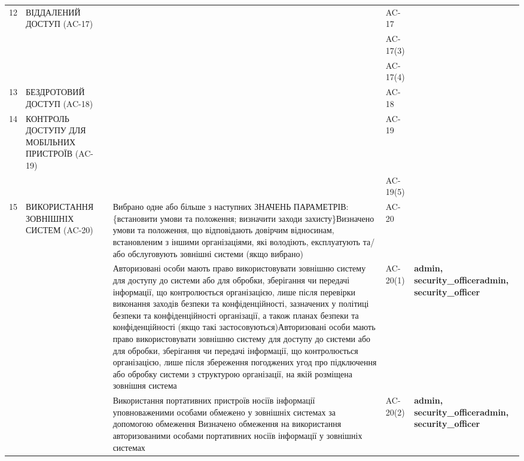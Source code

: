 \documentclass[10pt]{article}
\begin{document}
\begin{longtable}{|c|>{\raggedright\arraybackslash}p{4cm}|>{\raggedright\arraybackslash}p{6cm}|>{\raggedright\arraybackslash}p{2cm}|>{\raggedright\arraybackslash}p{4cm}|}
12 & ВІДДАЛЕНИЙ ДОСТУП (AC-17) &  & AC-17 &  \\ \cline{3-5}
 &  &  & AC-17(3) &  \\ \cline{3-5}
 &  &  & AC-17(4) &  \\ \hline
13 & БЕЗДРОТОВИЙ ДОСТУП (AC-18) &  & AC-18 &  \\ \hline
14 & КОНТРОЛЬ ДОСТУПУ ДЛЯ МОБІЛЬНИХ ПРИСТРОЇВ (AC-19) &  & AC-19 &  \\ \cline{3-5}
 &  &  & AC-19(5) &  \\ \hline
15 & ВИКОРИСТАННЯ ЗОВНІШНІХ СИСТЕМ (AC-20) & Вибрано одне або більше з наступних ЗНАЧЕНЬ ПАРАМЕТРІВ: \{встановити умови та положення; визначити заходи захисту\}\newline Визначено умови та положення, що відповідають довірчим відносинам, встановленим з іншими організаціями, які володіють, експлуатують та/або обслуговують зовнішні системи (якщо вибрано) & AC-20 & \textbf{}\newline \textbf{} \\ \cline{3-5}
 &  & Авторизовані особи мають право використовувати зовнішню систему для доступу до системи або для обробки, зберігання чи передачі інформації, що контролюється організацією, лише після перевірки виконання заходів безпеки та конфіденційності, зазначених у політиці безпеки та конфіденційності організації, а також планах безпеки та конфіденційності (якщо такі застосовуються)\newline Авторизовані особи мають право використовувати зовнішню систему для доступу до системи або для обробки, зберігання чи передачі інформації, що контролюється організацією, лише після збереження погоджених угод про підключення або обробку системи з структурою організації, на якій розміщена зовнішня система & AC-20(1) & \textbf{admin, security\_\allowbreak{}officer}\newline \textbf{admin, security\_\allowbreak{}officer} \\ \cline{3-5}
 &  & Використання портативних пристроїв носіїв інформації уповноваженими особами обмежено у зовнішніх системах за допомогою обмеження \newline Визначено обмеження на використання авторизованими особами портативних носіїв інформації у зовнішніх системах & AC-20(2) & \textbf{admin, security\_\allowbreak{}officer}\newline \textbf{admin, security\_\allowbreak{}officer} \\ \hline

\end{longtable}
\end{document}
